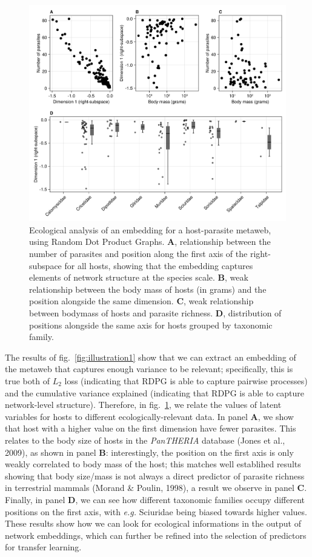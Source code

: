 \documentclass[11pt]{article}
\makeatletter
\def\maxwidth{\ifdim\Gin@nat@width>\linewidth\linewidth
\else\Gin@nat@width\fi}
\let\Oldincludegraphics\includegraphics
\renewcommand{\includegraphics}[1]{\Oldincludegraphics[width=\maxwidth]{#1}}
\makeatother
\begin{document}
\begin{figure}
\hypertarget{fig:illustration2}{%
\centering
\includegraphics{figures/illustration-part2.png}
\caption{Ecological analysis of an embedding for a host-parasite
metaweb, using Random Dot Product Graphs. \textbf{A}, relationship
between the number of parasites and position along the first axis of the
right-subspace for all hosts, showing that the embedding captures
elements of network structure at the species scale. \textbf{B}, weak
relationship between the body mass of hosts (in grams) and the position
alongside the same dimension. \textbf{C}, weak relationship between
bodymass of hosts and parasite richness. \textbf{D}, distribution of
positions alongside the same axis for hosts grouped by taxonomic
family.}\label{fig:illustration2}
}
\end{figure}

The results of fig.~\ref{fig:illustration1} show that we can extract an
embedding of the metaweb that captures enough variance to be relevant;
specifically, this is true both of \(L_2\) loss (indicating that RDPG is
able to capture pairwise processes) and the cumulative variance
explained (indicating that RDPG is able to capture network-level
structure). Therefore, in fig.~\ref{fig:illustration2}, we relate the
values of latent variables for hosts to different ecologically-relevant
data. In panel \textbf{A}, we show that host with a higher value on the
first dimension have fewer parasites. This relates to the body size of
hosts in the \emph{PanTHERIA} database (Jones et al., 2009), as shown in
panel \textbf{B}: interestingly, the position on the first axis is only
weakly correlated to body mass of the host; this matches well establihed
results showing that body size/mass is not always a direct predictor of
parasite richness in terrestrial mammals (Morand \& Poulin, 1998), a
result we observe in panel \textbf{C}. Finally, in panel \textbf{D}, we
can see how different taxonomic families occupy different positions on
the first axis, with \emph{e.g.} Sciuridae being biased towards higher
values. These results show how we can look for ecological informations
in the output of network embeddings, which can further be refined into
the selection of predictors for transfer learning.
\end{document}

